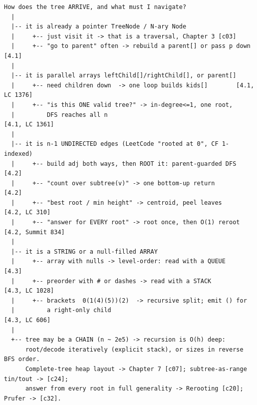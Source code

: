 \begin{lstlisting}[language={}, basicstyle=\ttfamily\small, numbers=none, frame=single]
  How does the tree ARRIVE, and what must I navigate?
  |
  |-- it is already a pointer TreeNode / N-ary Node
  |     +-- just visit it -> that is a traversal, Chapter 3 [c03]
  |     +-- "go to parent" often -> rebuild a parent[] or pass p down [4.1]
  |
  |-- it is parallel arrays leftChild[]/rightChild[], or parent[]
  |     +-- need children down  -> one loop builds kids[]        [4.1, LC 1376]
  |     +-- "is this ONE valid tree?" -> in-degree<=1, one root,
  |         DFS reaches all n                                        [4.1, LC 1361]
  |
  |-- it is n-1 UNDIRECTED edges (LeetCode "rooted at 0", CF 1-indexed)
  |     +-- build adj both ways, then ROOT it: parent-guarded DFS  [4.2]
  |     +-- "count over subtree(v)" -> one bottom-up return        [4.2]
  |     +-- "best root / min height" -> centroid, peel leaves      [4.2, LC 310]
  |     +-- "answer for EVERY root" -> root once, then O(1) reroot [4.2, Summit 834]
  |
  |-- it is a STRING or a null-filled ARRAY
  |     +-- array with nulls -> level-order: read with a QUEUE     [4.3]
  |     +-- preorder with # or dashes -> read with a STACK         [4.3, LC 1028]
  |     +-- brackets  0(1(4)(5))(2)  -> recursive split; emit () for
  |         a right-only child                                       [4.3, LC 606]
  |
  +-- tree may be a CHAIN (n ~ 2e5) -> recursion is O(h) deep:
      root/decode iteratively (explicit stack), or sizes in reverse BFS order.
      Complete-tree heap layout -> Chapter 7 [c07]; subtree-as-range tin/tout -> [c24];
      answer from every root in full generality -> Rerooting [c20]; Prufer -> [c32].
\end{lstlisting}


